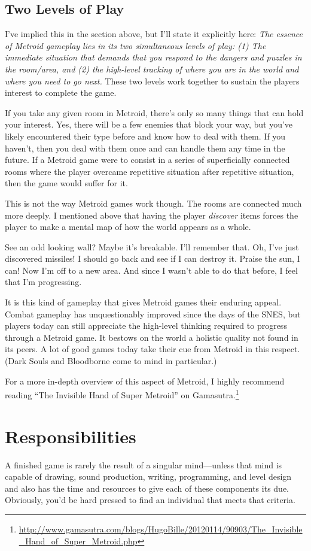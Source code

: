 \documentclass{article}
\begin{document}
\subsection*{Two Levels of Play}
I've implied this in the section above, but I'll state it explicitly here: \emph{The essence of Metroid gameplay lies in its two simultaneous levels of play: (1) The immediate situation that demands that you respond to the dangers  and puzzles in the room/area, and (2) the high-level tracking of where you are in the world and where you need to go next.} These two levels work together to sustain the players interest to complete the game.

If you take any given room in Metroid, there's only so many things that can hold your interest. Yes, there will be a few enemies that block your way, but you've likely encountered their type before and know how to deal with them. If you haven't, then you deal with them once and can handle them any time in the future. If a Metroid game were to consist in a series of superficially connected rooms where the player overcame repetitive situation after repetitive situation, then the game would suffer for it.

This is not the way Metroid games work though. The rooms are connected much more deeply. I mentioned above that having the player \emph{discover} items forces the player to make a mental map of how the world appears as a whole.

See an odd looking wall? Maybe it's breakable. I'll remember that. Oh, I've just discovered missiles! I should go back and see if I can destroy it. Praise the sun, I can! Now I'm off to a new area. And since I wasn't able to do that before, I feel that I'm progressing.

It is this kind of gameplay that gives Metroid games their enduring appeal. Combat gameplay has unquestionably improved since the days of the SNES, but players today can still appreciate the high-level thinking required to progress through a Metroid game. It bestows on the world a holistic quality not found in its peers. A lot of good games today take their cue from Metroid in this respect. (Dark Souls and Bloodborne come to mind in particular.)

For a more in-depth overview of this aspect of Metroid, I highly recommend reading ``The Invisible Hand of Super Metroid'' on Gamasutra.\footnote{\url{http://www.gamasutra.com/blogs/HugoBille/20120114/90903/The_Invisible_Hand_of_Super_Metroid.php}}

\section{Responsibilities}
A finished game is rarely the result of a singular mind---unless that mind is capable of drawing, sound production, writing, programming, and level design and also has the time and resources to give each of these components its due. Obviously, you'd be hard pressed to find an individual that meets that criteria.
\end{document}

